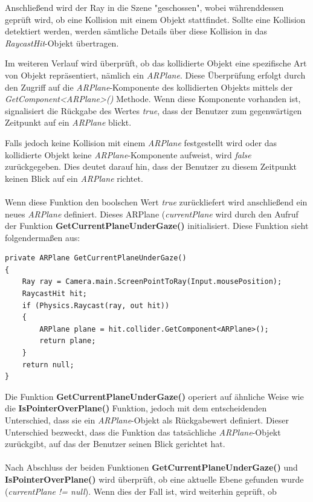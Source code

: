 Anschließend wird der Ray in die Szene "geschossen", wobei währenddessen geprüft wird, ob eine Kollision mit einem Objekt
stattfindet. Sollte eine Kollision detektiert werden, werden sämtliche Details über diese Kollision in das
\textit{RaycastHit}-Objekt übertragen.

Im weiteren Verlauf wird überprüft, ob das kollidierte Objekt eine spezifische Art von Objekt repräsentiert, nämlich ein
\textit{ARPlane}. Diese Überprüfung erfolgt durch den Zugriff auf die \textit{ARPlane}-Komponente des kollidierten Objekts
mittels der \textit{GetComponent<ARPlane>()} Methode. Wenn diese Komponente vorhanden ist, signalisiert die
Rückgabe des Wertes \textit{true}, dass der Benutzer zum gegenwärtigen Zeitpunkt auf ein \textit{ARPlane} blickt.

Falls jedoch keine Kollision mit einem \textit{ARPlane} festgestellt wird oder das kollidierte Objekt keine
\textit{ARPlane}-Komponente aufweist, wird \textit{false} zurückgegeben. Dies deutet darauf hin, dass der Benutzer zu
diesem Zeitpunkt keinen Blick auf ein \textit{ARPlane} richtet.\\
\\
Wenn diese Funktion den boolschen Wert \textit{true} zurückliefert wird anschließend ein neues \textit{ARPlane} definiert.
Dieses ARPlane (\textit{currentPlane} wird durch den Aufruf der Funktion \textbf{GetCurrentPlaneUnderGaze()} initialisiert.
Diese Funktion sieht folgendermaßen aus:
\begin{lstlisting}[caption={Gewolltes ARPlane ermitteln}, label=code:isPOP]
private ARPlane GetCurrentPlaneUnderGaze()
{
    Ray ray = Camera.main.ScreenPointToRay(Input.mousePosition);
    RaycastHit hit;
    if (Physics.Raycast(ray, out hit))
    {
        ARPlane plane = hit.collider.GetComponent<ARPlane>();
        return plane;
    }
    return null;
}
\end{lstlisting}
Die Funktion \textbf{GetCurrentPlaneUnderGaze()} operiert auf ähnliche Weise wie die \textbf{IsPointerOverPlane()} Funktion,
jedoch mit dem entscheidenden Unterschied, dass sie ein \textit{ARPlane}-Objekt als Rückgabewert definiert. Dieser
Unterschied bezweckt, dass die Funktion das tatsächliche \textit{ARPlane}-Objekt zurückgibt, auf das der Benutzer seinen
Blick gerichtet hat.\\
\\
Nach Abschluss der beiden Funktionen \textbf{GetCurrentPlaneUnderGaze()} und \textbf{IsPointerOverPlane()} wird überprüft,
ob eine aktuelle Ebene gefunden wurde (\textit{currentPlane != null}). Wenn dies der Fall ist, wird weiterhin geprüft, ob
